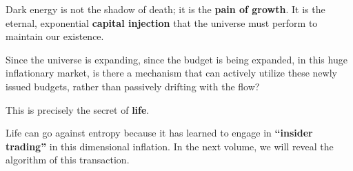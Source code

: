 Dark energy is not the shadow of death; it is the \textbf{pain of growth}. It is the eternal, exponential \textbf{capital injection} that the universe must perform to maintain our existence.

Since the universe is expanding, since the budget is being expanded, in this huge inflationary market, is there a mechanism that can actively utilize these newly issued budgets, rather than passively drifting with the flow?

This is precisely the secret of \textbf{life}.

Life can go against entropy because it has learned to engage in \textbf{``insider trading''} in this dimensional inflation. In the next volume, we will reveal the algorithm of this transaction.

